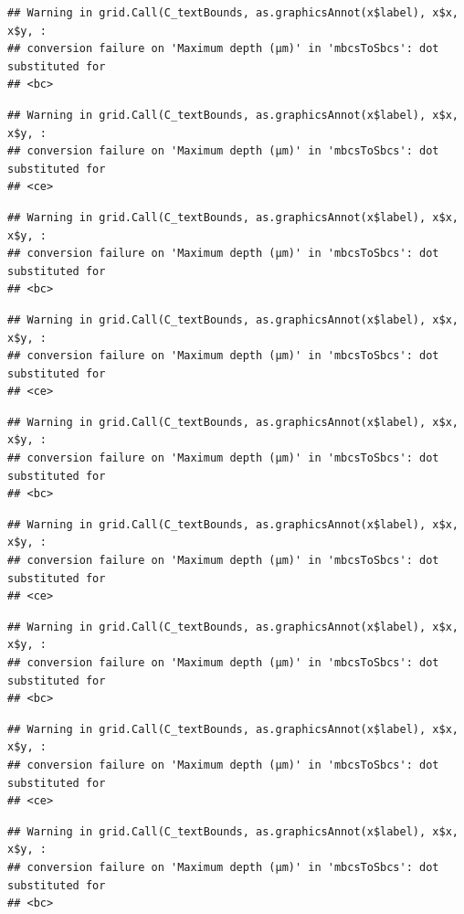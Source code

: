 \documentclass[
]{article}
\begin{document}
\begin{verbatim}
## Warning in grid.Call(C_textBounds, as.graphicsAnnot(x$label), x$x, x$y, :
## conversion failure on 'Maximum depth (μm)' in 'mbcsToSbcs': dot substituted for
## <bc>
\end{verbatim}

\begin{verbatim}
## Warning in grid.Call(C_textBounds, as.graphicsAnnot(x$label), x$x, x$y, :
## conversion failure on 'Maximum depth (μm)' in 'mbcsToSbcs': dot substituted for
## <ce>
\end{verbatim}

\begin{verbatim}
## Warning in grid.Call(C_textBounds, as.graphicsAnnot(x$label), x$x, x$y, :
## conversion failure on 'Maximum depth (μm)' in 'mbcsToSbcs': dot substituted for
## <bc>
\end{verbatim}

\begin{verbatim}
## Warning in grid.Call(C_textBounds, as.graphicsAnnot(x$label), x$x, x$y, :
## conversion failure on 'Maximum depth (μm)' in 'mbcsToSbcs': dot substituted for
## <ce>
\end{verbatim}

\begin{verbatim}
## Warning in grid.Call(C_textBounds, as.graphicsAnnot(x$label), x$x, x$y, :
## conversion failure on 'Maximum depth (μm)' in 'mbcsToSbcs': dot substituted for
## <bc>
\end{verbatim}

\begin{verbatim}
## Warning in grid.Call(C_textBounds, as.graphicsAnnot(x$label), x$x, x$y, :
## conversion failure on 'Maximum depth (μm)' in 'mbcsToSbcs': dot substituted for
## <ce>
\end{verbatim}

\begin{verbatim}
## Warning in grid.Call(C_textBounds, as.graphicsAnnot(x$label), x$x, x$y, :
## conversion failure on 'Maximum depth (μm)' in 'mbcsToSbcs': dot substituted for
## <bc>
\end{verbatim}

\begin{verbatim}
## Warning in grid.Call(C_textBounds, as.graphicsAnnot(x$label), x$x, x$y, :
## conversion failure on 'Maximum depth (μm)' in 'mbcsToSbcs': dot substituted for
## <ce>
\end{verbatim}

\begin{verbatim}
## Warning in grid.Call(C_textBounds, as.graphicsAnnot(x$label), x$x, x$y, :
## conversion failure on 'Maximum depth (μm)' in 'mbcsToSbcs': dot substituted for
## <bc>
\end{verbatim}
\end{document}
